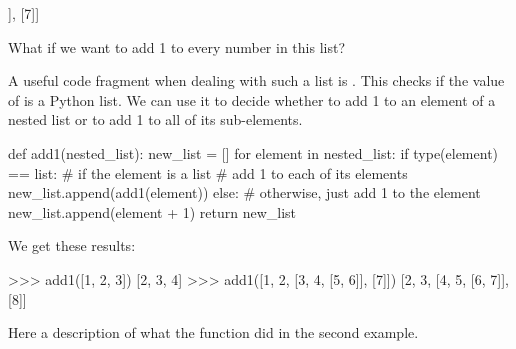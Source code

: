 \documentclass[11pt]{cselabheader}
\begin{document}
\begin{python3code}
[1, 2, [3, 4, [5, 6]], [7]]
\end{python3code}

What if we want to add 1 to every number in this list?

A useful code fragment when dealing with such a list is
.  This checks if the value of
 is a Python list.  We can use it to decide
whether to add 1 to an element of a nested list or to add 1 to all of
its sub-elements.

\begin{python3code}
def add1(nested_list):
    new_list = []
    for element in nested_list:
        if type(element) == list:
            # if the element is a list
            # add 1 to each of its elements
            new_list.append(add1(element))
        else:
            # otherwise, just add 1 to the element
            new_list.append(element + 1)
    return new_list
\end{python3code}

We get these results:

\begin{python3code}
>>> add1([1, 2, 3])
[2, 3, 4]
>>> add1([1, 2, [3, 4, [5, 6]], [7]])
[2, 3, [4, 5, [6, 7]], [8]]
\end{python3code}

Here a description of what the function  did in the
second example.
\end{document}
